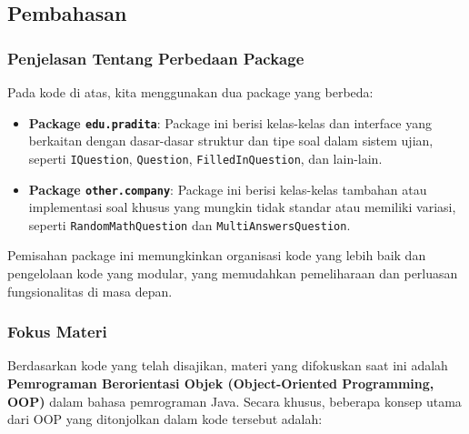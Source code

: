 \subsection{Pembahasan}

\subsubsection{Penjelasan Tentang Perbedaan Package}

Pada kode di atas, kita menggunakan dua package yang berbeda:

\begin{itemize}
	\item \textbf{Package \texttt{edu.pradita}}: Package ini berisi kelas-kelas dan interface yang berkaitan dengan dasar-dasar struktur dan tipe soal dalam sistem ujian, seperti \texttt{IQuestion}, \texttt{Question}, \texttt{FilledInQuestion}, dan lain-lain.
	
	\item \textbf{Package \texttt{other.company}}: Package ini berisi kelas-kelas tambahan atau implementasi soal khusus yang mungkin tidak standar atau memiliki variasi, seperti \texttt{RandomMathQuestion} dan \texttt{MultiAnswersQuestion}.
\end{itemize}

Pemisahan package ini memungkinkan organisasi kode yang lebih baik dan pengelolaan kode yang modular, yang memudahkan pemeliharaan dan perluasan fungsionalitas di masa depan.

\subsubsection{Fokus Materi}

Berdasarkan kode yang telah disajikan, materi yang difokuskan saat ini adalah \textbf{Pemrograman Berorientasi Objek (Object-Oriented Programming, OOP)} dalam bahasa pemrograman Java. Secara khusus, beberapa konsep utama dari OOP yang ditonjolkan dalam kode tersebut adalah:

